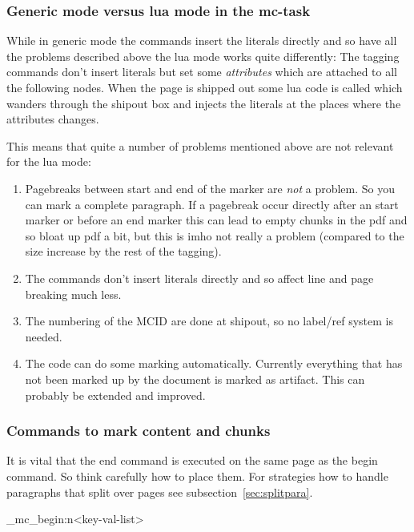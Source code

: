 \documentclass[DIV=12,parskip=half-,bibliography=totoc]{scrartcl}
\begin{document}
\subsubsection{Generic mode versus lua mode in the mc-task}

While in generic mode the commands insert the literals directly and so have all the problems described above the lua mode works quite differently: The tagging commands don't insert literals but set some \emph{attributes} which are attached to all the following nodes. When the page is shipped out some lua code is called which wanders through the shipout box and injects the literals at the places where the attributes changes.

This means that quite a number of problems mentioned above are not relevant for the lua mode:

\begin{enumerate}
\item Pagebreaks between start and end of the marker are \emph{not} a problem. So you can mark a complete paragraph. If a pagebreak occur directly after an start marker or before an end marker this can lead to empty chunks in the pdf and so bloat up pdf a bit, but this is imho not really a problem (compared to the size increase by the rest of the tagging).
\item The commands don't insert literals directly and so affect line and page breaking much less.
\item The numbering of the MCID are done at shipout, so no label/ref system is needed.
\item The code can do some marking automatically. Currently everything that has not been marked up by the document is marked as artifact. This can probably be extended and improved.
\end{enumerate}

\subsubsection{Commands to mark content and chunks}

It is vital that the end command is executed on the same page as the begin command. So think carefully how to place them.
For strategies how to handle paragraphs that split over pages see subsection~\ref{sec:splitpara}.

\ExplSyntaxOn
\DescribeMacro{}
\DescribeMacro\uftag_mc_begin:n{<key-val-list>}
\ExplSyntaxOff
\end{document}
